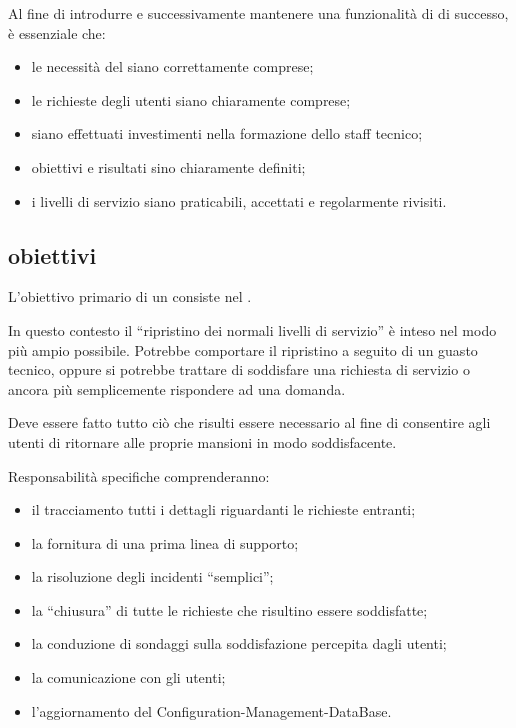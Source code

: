 Al fine di introdurre e successivamente mantenere una funzionalità di  di successo, è essenziale che:

\begin{itemize}
\item{le necessità del  siano correttamente comprese;}
\item{le richieste degli utenti siano chiaramente comprese;}
\item{siano effettuati investimenti nella formazione dello staff tecnico;}
\item{obiettivi e risultati sino chiaramente definiti;}
\item{i livelli di servizio siano praticabili, accettati e regolarmente rivisiti.}
\end{itemize}

\subsection[Obiettivi]{obiettivi}
\label{sd-objectives}
L'obiettivo primario di un  consiste nel . 

In questo contesto il ``ripristino dei normali livelli di servizio'' è inteso nel modo più ampio possibile. Potrebbe comportare il ripristino a seguito di un guasto tecnico, oppure si potrebbe trattare di soddisfare una richiesta di servizio o ancora più semplicemente rispondere ad una domanda. 

Deve essere fatto tutto ciò che risulti essere necessario al fine di consentire agli utenti di ritornare alle proprie mansioni in modo soddisfacente.

Responsabilità specifiche comprenderanno:

\begin{itemize}
\item{il tracciamento tutti i dettagli riguardanti le richieste entranti;}
\item{la fornitura di una prima linea di supporto;}
\item{la risoluzione degli incidenti ``semplici'';}
\item{la ``chiusura'' di tutte le richieste che risultino essere soddisfatte;}
\item{la conduzione di sondaggi sulla soddisfazione percepita dagli utenti;}
\item{la comunicazione con gli utenti;}
\item{l'aggiornamento del \ac{Configuration-Management-DataBase}.}
\end{itemize}


